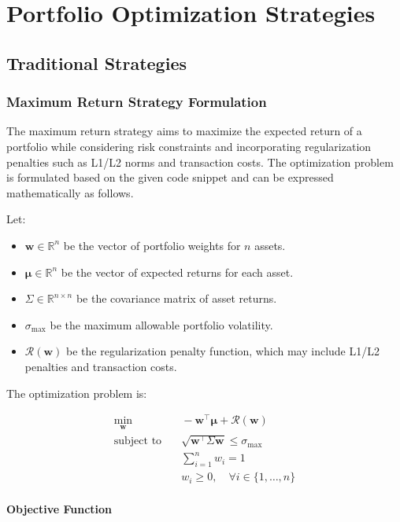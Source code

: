 \section{Portfolio Optimization Strategies}

\subsection{Traditional Strategies}
\subsubsection{Maximum Return Strategy Formulation}

The maximum return strategy aims to maximize the expected return of a portfolio while considering risk constraints and incorporating regularization penalties such as L1/L2 norms and transaction costs. The optimization problem is formulated based on the given code snippet and can be expressed mathematically as follows.

Let:

\begin{itemize}
    \item \( \mathbf{w} \in \mathbb{R}^n \) be the vector of portfolio weights for \( n \) assets.
    \item \( \boldsymbol{\mu} \in \mathbb{R}^n \) be the vector of expected returns for each asset.
    \item \( \Sigma \in \mathbb{R}^{n \times n} \) be the covariance matrix of asset returns.
    \item \( \sigma_{\text{max}} \) be the maximum allowable portfolio volatility.
    \item \( \mathcal{R}(\mathbf{w}) \) be the regularization penalty function, which may include L1/L2 penalties and transaction costs.
\end{itemize}

The optimization problem is:

\[
\begin{aligned}
\min_{\mathbf{w}} & \quad -\mathbf{w}^\top \boldsymbol{\mu} + \mathcal{R}(\mathbf{w}) \\
\text{subject to} & \quad \sqrt{\mathbf{w}^\top \Sigma \mathbf{w}} \leq \sigma_{\text{max}} \\
& \quad \sum_{i=1}^n w_i = 1 \\
& \quad w_i \geq 0, \quad \forall i \in \{1, \dots, n\}
\end{aligned}
\]

\paragraph{Objective Function}

